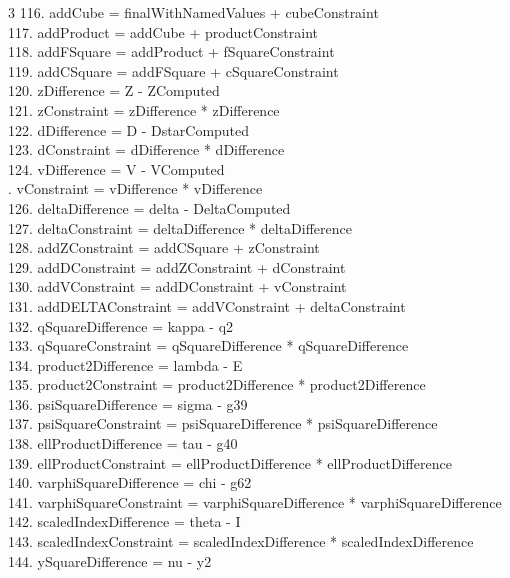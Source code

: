 \documentclass[10pt]{article}
\begin{document}
\begin{multicols}{3}
116. addCube = finalWithNamedValues + cubeConstraint\\
117. addProduct = addCube + productConstraint\\
118. addFSquare = addProduct + fSquareConstraint\\
119. addCSquare = addFSquare + cSquareConstraint\\
120. zDifference = Z - ZComputed\\
121. zConstraint = zDifference * zDifference\\
122. dDifference = D - DstarComputed\\
123. dConstraint = dDifference * dDifference\\
124. vDifference = V - VComputed\\
. vConstraint = vDifference * vDifference\\
126. deltaDifference = delta - DeltaComputed\\
127. deltaConstraint = deltaDifference * deltaDifference\\
128. addZConstraint = addCSquare + zConstraint\\
129. addDConstraint = addZConstraint + dConstraint\\
130. addVConstraint = addDConstraint + vConstraint\\
131. addDELTAConstraint = addVConstraint + deltaConstraint\\
132. qSquareDifference = kappa - q2\\
133. qSquareConstraint = qSquareDifference * qSquareDifference\\
134. product2Difference = lambda - E\\
135. product2Constraint = product2Difference * product2Difference\\
136. psiSquareDifference = sigma - g39\\
137. psiSquareConstraint = psiSquareDifference * psiSquareDifference\\
138. ellProductDifference = tau - g40\\
139. ellProductConstraint = ellProductDifference * ellProductDifference\\
140. varphiSquareDifference = chi - g62\\
141. varphiSquareConstraint = varphiSquareDifference * varphiSquareDifference\\
142. scaledIndexDifference = theta - I\\
143. scaledIndexConstraint = scaledIndexDifference * scaledIndexDifference\\
144. ySquareDifference = nu - y2\\

\end{multicols}
\end{document}
